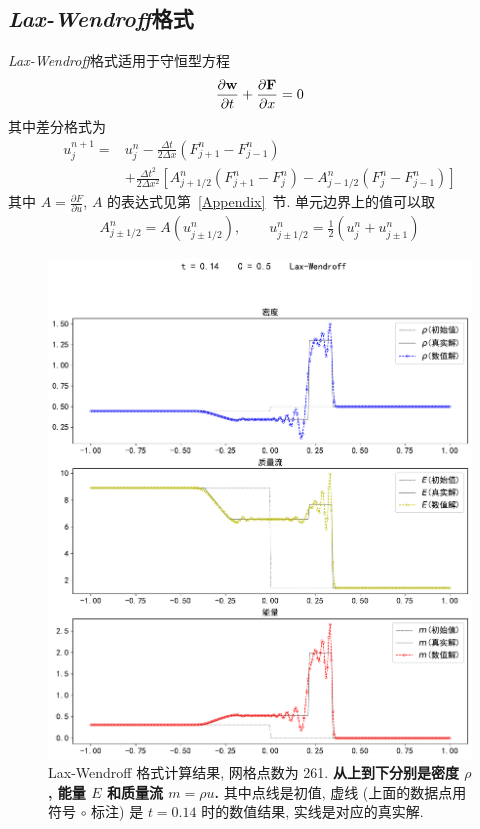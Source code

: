 \documentclass[10.5pt
]{article}
\begin{document}
\subsection{\textit{Lax-Wendroff}格式}
\textit{Lax-Wendroff}格式适用于守恒型方程
\begin{align}
\frac{\partial \vb w}{\partial t} + \frac{\partial \vb F}{\partial x} = 0
\end{align}
其中差分格式为
\begin{align}
u_j^{n+1} =& u_j^n - \frac{\Delta t}{2\Delta x} (F_{j+1}^n - F_{j-1}^n) \nonumber\\
& + \frac{\Delta t^2}{2\Delta x^2} \left[A_{j+1/2}^n (F_{j+1}^n-F_j^n) - A_{j-1/2}^n (F_j^n -
F_{j-1}^n)\right]
\end{align}
其中 $A = \frac{\partial F}{\partial u}$, $A$ 的表达式见第~\ref{Appendix}~节. 单元边界上的值可以取
\begin{align}
A_{j \pm 1/2}^n = A(u_{j \pm 1/2}^n), \qquad u_{j \pm 1/2}^n = \frac{1}{2} (u_j^n + u_{j \pm 1}^n)
\end{align}
\begin{figure}
\begin{center}
\includegraphics[width=.85\textwidth]{figures/lax_wendroff261.pdf}
\caption{Lax-Wendroff 格式计算结果, 网格点数为 261. \textbf{从上到下分别是密度 $\rho$, 能量 $E$ 和质量流 $m = \rho u$.}
其中点线是初值, 虚线 (上面的数据点用符号 $\circ$ 标注) 是 $t=0.14$ 时的数值结果, 实线是对应的真实解.}\label{fig:lax_wendroff}
\end{center}
\end{figure}
\end{document}
